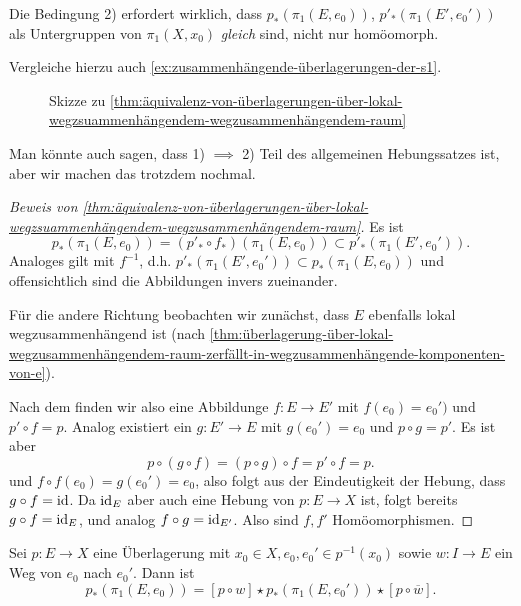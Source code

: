 \begin{warning}
    Die Bedingung 2) erfordert wirklich, dass $p_*(\pi_1(E,e_0))$, $p'_*(\pi_1(E',e_0'))$ als Untergruppen von $\pi_1(X,x_0)$ \textit{gleich} sind, nicht nur homöomorph.

    Vergleiche hierzu auch \autoref{ex:zusammenhängende-überlagerungen-der-s1}. 
\end{warning}

\begin{figure}[ht]
    \centering
    \caption{Skizze zu \autoref{thm:äquivalenz-von-überlagerungen-über-lokal-wegzsuammenhängendem-wegzusammenhängendem-raum}}
    \label{fig:skizze-zur-äquivalenz-von-überlagerungen}
\end{figure}

\begin{oral}
    Man könnte auch sagen, dass 1) $\implies$ 2) Teil des allgemeinen Hebungssatzes ist, aber wir machen das trotzdem nochmal.
\end{oral}

\begin{proof}[Beweis von \autoref{thm:äquivalenz-von-überlagerungen-über-lokal-wegzsuammenhängendem-wegzusammenhängendem-raum}]
    Es ist 
    \[
        p_*(\pi_1(E,e_0)) = (p'_* \circ  f_*)(\pi_1(E,e_0)) \subset p'_*(\pi_1(E',e_0'))
    .\] 
    Analoges gilt mit $f^{-1}$, d.h. $p'_*(\pi_1(E',e_0'))\subset p_*(\pi_1(E,e_0))$ und offensichtlich sind die Abbildungen invers zueinander.

    Für die andere Richtung beobachten wir zunächst, dass $E$ ebenfalls lokal wegzusammenhängend ist (nach  \autoref{thm:überlagerung-über-lokal-wegzusammenhängendem-raum-zerfällt-in-wegzusammenhängende-komponenten-von-e}).

    Nach dem  finden wir also eine Abbildunge $f\colon  E \to  E'$ mit $f(e_0) = e_0')$ und $p' \circ  f = p$. Analog existiert ein $g\colon  E ' \to  E$ mit $g(e_0') = e_0$ und $ p \circ  g = p'$. Es ist aber
    \[
        p \circ (g \circ  f) = (p \circ  g) \circ  f = p' \circ  f = p
    .\] 
    und  $f\circ  f(e_0) = g(e_0' ) = e_0$, also folgt aus der Eindeutigkeit der Hebung, dass $g \circ f = \mathrm{id}$. Da $\mathrm{id}_E$ aber auch eine Hebung von  $p\colon  E \to X$ ist, folgt bereits $g \circ  f = \mathrm{id}_E$, und analog $f \circ  g = \mathrm{id}_{E'}$. Also sind $f,f'$ Homöomorphismen.
\end{proof}

\begin{theorem}\label{thm:charakteristische-untergruppen-innerhalb-der-faser-sind-nur-konjugiert-wenn-weg-zwischen-urbildern-existiert}
    Sei $p\colon  E \to  X$ eine Überlagerung mit $x_0\in X, e_0,e_0' \in p^{-1} (x_0)$ sowie $w\colon  I \to  E$ ein Weg von $e_0$ nach $e_0'$. Dann ist
    \[
        p_*(\pi_1(E,e_0)) = [p \circ  w] \star p_*(\pi_1(E,e_0')) \star [p \circ  \overline{w}]
    .\] 
\end{theorem}

